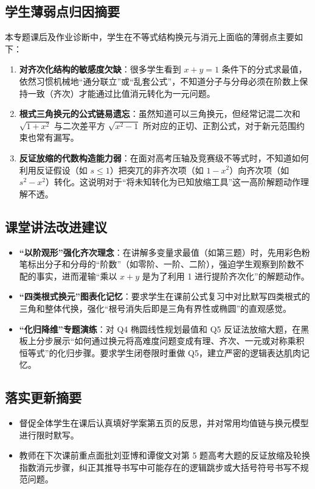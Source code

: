 \documentclass[11pt,a4paper]{ctexart}
\begin{document}
\subsection{学生薄弱点归因摘要}
本专题课后及作业诊断中，学生在不等式结构换元与消元上面临的薄弱点主要如下：
\begin{enumerate}[label=\arabic*. , leftmargin=2em, itemsep=0.1em, topsep=0.2em]
  \item \textbf{对齐次化结构的敏感度欠缺}：很多学生看到 \(x+y=1\) 条件下的分式求最值，依然习惯机械地“通分联立”或“乱套公式”，不知道分子与分母必须在阶数上保持一致（齐次）才能通过比值消元转化为一元问题。
  \item \textbf{根式三角换元的公式链易遗忘}：虽然知道可以三角换元，但经常记混二次和 \(\sqrt{1+x^2}\) 与二次差平方 \(\sqrt{x^2-1}\) 所对应的正切、正割公式，对于新元范围约束也常有漏写。
  \item \textbf{反证放缩的代数构造能力弱}：在面对高考压轴及竞赛级不等式时，不知道如何利用反证假设（如 \(s \leqslant 1\)）把突兀的非齐次项（如 \(1-x^2\)）向齐次项（如 \(s^2-x^2\)）转化。这说明对于“将未知转化为已知放缩工具”这一高阶解题动作理解不透。
\end{enumerate}

\subsection{课堂讲法改进建议}
\begin{itemize}[leftmargin=2em, itemsep=0.1em, topsep=0.2em]
  \item \textbf{“以阶观形”强化齐次理念}：在讲解多变量求最值（如第三题）时，先用彩色粉笔标出分子和分母的“阶数”（如零阶、一阶、二阶），强迫学生观察到阶数不配的事实，进而灌输“乘以 \(x+y\) 是为了利用 1 进行提阶齐次化”的解题动作。
  \item \textbf{“四类根式换元”图表化记忆}：要求学生在课前公式复习中对比默写四类根式的三角和整体代换，强化“根号消失后即是三角有界性或椭圆”的直观感觉。
  \item \textbf{“化归降维”专题演练}：对 Q4 椭圆线性规划最值和 Q5 反证法放缩大题，在黑板上分步展示“如何通过换元将高难度问题变成有理、齐次、一元或对称乘积恒等式”的化归步骤。要求学生闭卷限时重做 Q5，建立严密的逻辑表达肌肉记忆。
\end{itemize}

\subsection{落实更新摘要}
\begin{itemize}[leftmargin=2em, itemsep=0.1em, topsep=0.2em]
  \item 督促全体学生在课后认真填好学案第五页的反思，并对常用均值链与换元模型进行限时默写。
  \item 教师在下次课前重点面批刘亚博和谭俊文对第 5 题高考大题的反证放缩及轮换指数消元步骤，纠正其推导书写中可能存在的逻辑跳步或大括号符号书写不规范问题。
\end{itemize}
\end{document}
